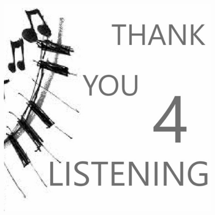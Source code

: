 \documentclass[pdf]{beamer}
\begin{document}
\begin{frame}
\begin{figure}
    \centering
    \includegraphics[width=0.8\linewidth]{screenshots/thanks_for_listening.jpeg}
\end{figure}
\end{frame}

\end{document}
